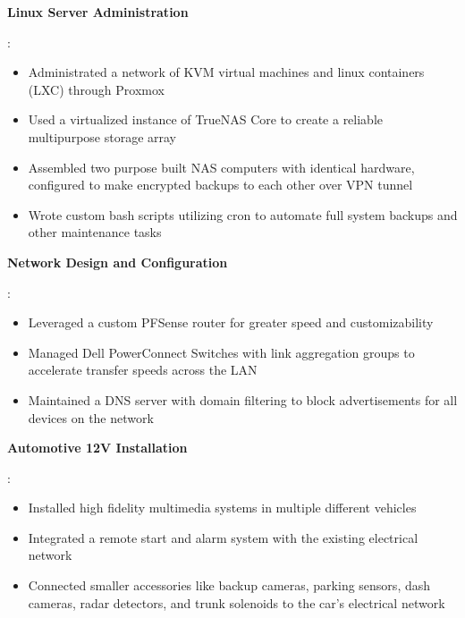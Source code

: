 \documentclass[letterpaper,11pt]{article}
\newcommand{\resumeItem}[2]{
  \item\small{
    \textbf{#1}{: #2 \vspace{-2pt}}
  }
}
\begin{document}
  \resumeItem{Linux Server Administration}
  {
    \begin{itemize}
      \item Administrated a network of KVM virtual machines and linux containers (LXC) through Proxmox
      \item Used a virtualized instance of TrueNAS Core to create a reliable multipurpose storage array
      \item Assembled two purpose built NAS computers with identical hardware, configured to make encrypted backups to each other over VPN tunnel
      \item Wrote custom bash scripts utilizing cron to automate full system backups and other maintenance tasks
  \end{itemize}
}
  \resumeItem{Network Design and Configuration}
  { 
  \begin{itemize}
      \item Leveraged a custom PFSense router for greater speed and customizability
      \item Managed Dell PowerConnect Switches with link aggregation groups to accelerate transfer speeds across the LAN
      \item Maintained a DNS server with domain filtering to block advertisements for all devices on the network
  \end{itemize}
  }
  \resumeItem{Automotive 12V Installation}
  {
  \begin{itemize}
    \item Installed high fidelity multimedia systems in multiple different vehicles
    \item Integrated a remote start and alarm system with the existing electrical network 
    \item Connected smaller accessories like backup cameras, parking sensors, dash cameras, radar detectors, and trunk solenoids to the car's electrical network
  \end{itemize}
  }
  
\end{document}
